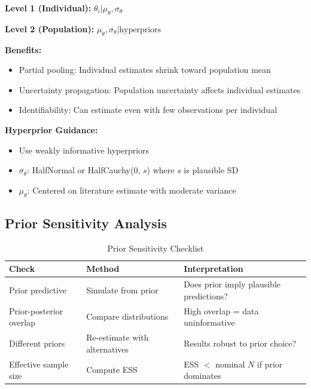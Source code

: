 \begin{tcolorbox}[colback=yellow!5!white, colframe=yellow!75!black,
    title=Hierarchical Prior Strategy]
\textbf{Level 1 (Individual):} $\theta_i | \mu_\theta, \sigma_\theta$

\textbf{Level 2 (Population):} $\mu_\theta, \sigma_\theta | \text{hyperpriors}$

\textbf{Benefits:}
\begin{itemize}[nosep]
\item Partial pooling: Individual estimates shrink toward population mean
\item Uncertainty propagation: Population uncertainty affects individual estimates
\item Identifiability: Can estimate even with few observations per individual
\end{itemize}

\textbf{Hyperprior Guidance:}
\begin{itemize}[nosep]
\item Use weakly informative hyperpriors
\item $\sigma_\theta$: HalfNormal or HalfCauchy(0, $s$) where $s$ is plausible SD
\item $\mu_\theta$: Centered on literature estimate with moderate variance
\end{itemize}
\end{tcolorbox}

\subsection{Prior Sensitivity Analysis}

\begin{table}[htbp]
\centering
\caption{Prior Sensitivity Checklist}
\label{tab:az-prior-sensitivity}
\renewcommand{\arraystretch}{1.3}
\begin{tabular}{@{}llp{5cm}@{}}
\toprule
\textbf{Check} & \textbf{Method} & \textbf{Interpretation} \\
\midrule
Prior predictive & Simulate from prior & Does prior imply plausible predictions? \\
Prior-posterior overlap & Compare distributions & High overlap = data uninformative \\
Different priors & Re-estimate with alternatives & Results robust to prior choice? \\
Effective sample size & Compute ESS & ESS $<$ nominal $N$ if prior dominates \\
\bottomrule
\end{tabular}
\end{table}


